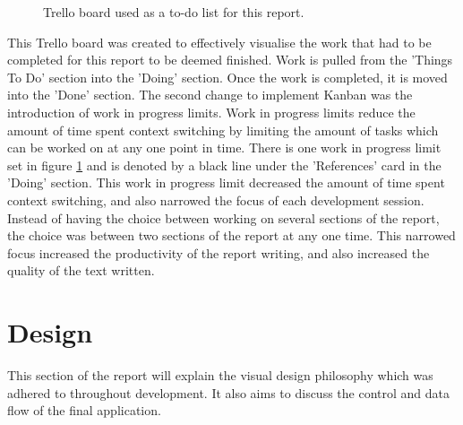 \documentclass{article}
\begin{document}
\begin{figure}[H]
	\centering
	\caption{Trello board used as a to-do list for this report.}
	\label{figure:trelloBoardOG}
\end{figure}

This Trello board was created to effectively visualise the work that had to be completed for this report to be deemed finished. Work is pulled from the 'Things To Do' section into the 'Doing' section. Once the work is completed, it is moved into the 'Done' section. The second change to implement Kanban was the introduction of work in progress limits. Work in progress limits reduce the amount of time spent context switching by limiting the amount of tasks which can be worked on at any one point in time. There is one work in progress limit set in figure \ref{figure:trelloBoardOG} and is denoted by a black line under the 'References' card in the 'Doing' section. This work in progress limit decreased the amount of time spent context switching, and also narrowed the focus of each development session. Instead of having the choice between working on several sections of the report, the choice was between two sections of the report at any one time. This narrowed focus increased the productivity of the report writing, and also increased the quality of the text written. 

%
%
%

\section{Design}
\label{section:design}

This section of the report will explain the visual design philosophy which was adhered to throughout development. It also aims to discuss the control and data flow of the final application. \par
\end{document}
